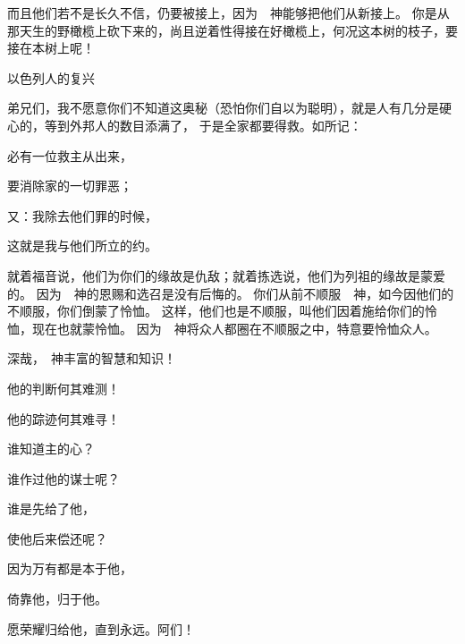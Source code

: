 {而且他们若不是长久不信，仍要被接上，因为　神能够把他们从新接上。
你是从那天生的野橄榄上砍下来的，尚且逆着性得接在好橄榄上，何况这本树的枝子，要接在本树上呢！
\par }{\SH 以色列人的复兴
\par }{\PP {}弟兄们，我不愿意你们不知道这奥秘（恐怕你们自以为聪明），就是{}人有几分是硬心的，等到外邦人的数目添满了，
于是{}全家都要得救。如{}所记：
\par }{\Q 必有一位救主从{}出来，
\par }{\Q 要消除{}家的一切罪恶；
\par }{\Q {}又{}：我除去他们罪的时候，
\par }{\Q 这就是我与他们所立的约。
\par }{\MM {}就着福音说，他们为你们的缘故是仇敌；就着拣选说，他们为列祖的缘故是蒙爱的。
因为　神的恩赐和选召是没有后悔的。
你们从前不顺服　神，如今因他们的不顺服，你们倒蒙了怜恤。
这样，他们也是不顺服，叫他们因着施给你们的怜恤，现在也就蒙怜恤。
因为　神将众人都圈在不顺服之中，特意要怜恤众人。
\par }{\Q {}深哉，　神丰富的智慧和知识！
\par }{\Q 他的判断何其难测！
\par }{\Q 他的踪迹何其难寻！
\par }{\Q {}谁知道主的心？
\par }{\Q 谁作过他的谋士呢？
\par }{\Q {}谁是先给了他，
\par }{\Q 使他后来偿还呢？
\par }{\Q {}因为万有都是本于他，
\par }{\Q 倚靠他，归于他。
\par }{\Q 愿荣耀归给他，直到永远。阿们！

}
